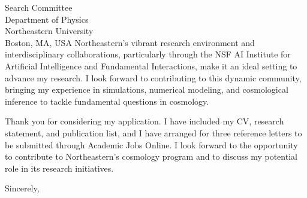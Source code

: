 \documentclass[11pt]{letter}
\begin{document}
\begin{letter}{Search Committee \\ Department of Physics \\ Northeastern University \\ Boston, MA, USA}
Northeastern’s vibrant research environment and interdisciplinary collaborations, particularly through the NSF AI Institute for Artificial Intelligence and Fundamental Interactions, make it an ideal setting to advance my research. I look forward to contributing to this dynamic community, bringing my experience in simulations, numerical modeling, and cosmological inference to tackle fundamental questions in cosmology.

Thank you for considering my application. I have included my CV, research statement, and publication list, and I have arranged for three reference letters to be submitted through Academic Jobs Online. I look forward to the opportunity to contribute to Northeastern’s cosmology program and to discuss my potential role in its research initiatives.

\closing{Sincerely,}

\end{letter}
\end{document}
